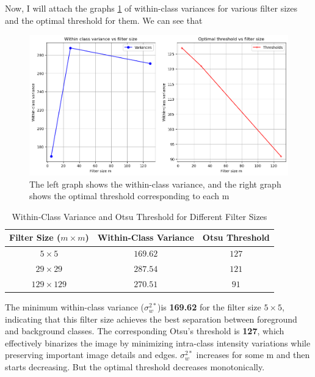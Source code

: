 \documentclass[12pt]{article}
\begin{document}
Now, I will attach the graphs \cref{fig:thresholds} of within-class variances for various filter sizes and the optimal threshold for them. 
We can see that 
\begin{figure}[h!]
    \centering
    \includegraphics[width=1\linewidth]{thresholds.png}
    \caption{The left graph shows the within-class variance, and the right graph shows the optimal threshold corresponding to each m}
    \label{fig:thresholds}
\end{figure}

\begin{table}[h]
\centering
\caption{Within-Class Variance and Otsu Threshold for Different Filter Sizes}
\begin{tabular}{|c|c|c|}
\hline
\textbf{Filter Size ($m \times m$)} & \textbf{Within-Class Variance} & \textbf{Otsu Threshold} \\
\hline
$5 \times 5$   & $169.62$ & $127$ \\
$29 \times 29$ & $287.54$ & $121$ \\
$129 \times 129$ & $270.51$ & $91$ \\
\hline
\end{tabular}
\end{table}

The minimum within-class variance ($\sigma_w^{2*} $)is \textbf{169.62} for the filter size \textbf{$5 \times 5$}, indicating that this filter size achieves the best separation between foreground and background classes. The corresponding Otsu's threshold is \textbf{127}, which effectively binarizes the image by minimizing intra-class intensity variations while preserving important image details and edges. $\sigma_w^{2*} $ increases for some m and then starts decreasing. But the optimal threshold decreases monotonically. 
\end{document}
